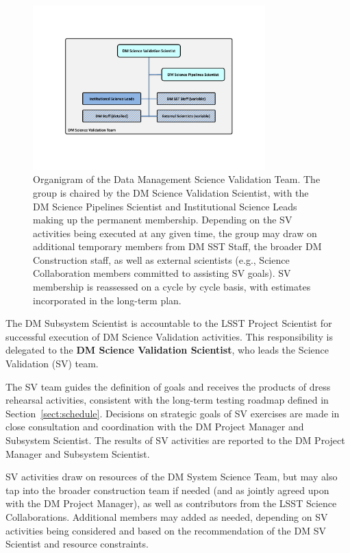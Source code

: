 \begin{figure}
\centering
\includegraphics[width=0.8\textwidth]{figures/dm-subsystem-science.pdf}
\caption{Organigram of the Data Management Science Validation Team.
The group is chaired by the DM Science Validation Scientist,
with the DM Science Pipelines Scientist and Institutional Science Leads making up
the permanent membership. Depending on the SV activities being executed at any
given time, the group may draw on additional temporary members from DM SST Staff,
the broader DM Construction staff, as well as external scientists (e.g.,
Science Collaboration members committed to assisting SV goals). SV membership
is reassessed on a cycle by cycle basis, with estimates incorporated in the
long-term plan.
\label{fig:DMsvg}}
\end{figure}

The DM Subsystem Scientist is accountable to the LSST Project Scientist for
successful execution of DM Science Validation activities.  This
responsibility is delegated to the \textbf{DM Science Validation Scientist},
who leads the Science Validation (SV) team.

The SV team guides the definition of goals and receives the products of
dress rehearsal activities, consistent with the long-term testing roadmap
defined in Section~\ref{sect:schedule}.  Decisions on strategic goals of SV exercises are made
in close consultation and coordination with the DM Project Manager and
Subsystem Scientist.  The results of SV activities are reported to the DM
Project Manager and Subsystem Scientist.

SV activities draw on resources of the DM System Science Team, but may also
tap into the broader construction team if needed (and as jointly agreed upon
with the DM Project Manager), as well as contributors from the LSST Science
Collaborations.  Additional members may added as needed, depending on SV
activities being considered and based on the recommendation of the DM SV
Scientist and resource constraints.

